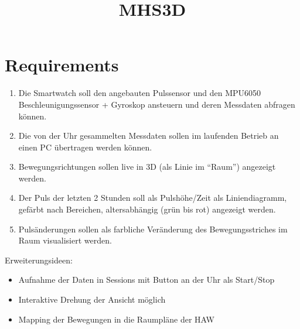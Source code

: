 \documentclass[a4paper, 11pt]{article}
\title{
    MHS3D
}
\begin{document}
\maketitle           
\clearpage

\tableofcontents
\clearpage

%
\section{Requirements}
\begin{enumerate}
    \item Die Smartwatch soll den angebauten Pulssensor und den MPU6050 Beschleunigungssensor + Gyroskop ansteuern und deren Messdaten abfragen können.
    \item Die von der Uhr gesammelten Messdaten sollen im laufenden Betrieb an einen PC übertragen werden können. 
    \item Bewegungsrichtungen sollen live in 3D (als Linie im “Raum”) angezeigt werden.
    \item Der Puls der letzten 2 Stunden soll als Pulshöhe/Zeit als Liniendiagramm, gefärbt nach Bereichen, altersabhängig (grün bis rot) angezeigt werden.
    \item Pulsänderungen sollen als farbliche Veränderung des Bewegungsstriches im Raum visualisiert werden.
\end{enumerate}

Erweiterungsideen:
\begin{itemize}
    \item Aufnahme der Daten in Sessions mit Button an der Uhr als Start/Stop
    \item Interaktive Drehung der Ansicht möglich
    \item Mapping der Bewegungen in die Raumpläne der HAW
\end{itemize}
\clearpage
\end{document}
